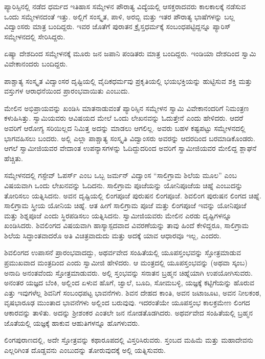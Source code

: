  ಪ್ಯಾರಿಸ್ಸಿನಲ್ಲಿ ನಡೆದ ಧರ್ಮದ ಇತಿಹಾಸ ಸಮ್ಮೇಳನ ಪೌರಾತ್ಯ ವಿದ್ಯೆಯಲ್ಲಿ ಆಸಕ್ತರಾದವರು ಕಾಲಕಾಲಕ್ಕೆ ನಡೆಸುವ ಒಂದು ಸಮ್ಮೇಳನದಂತೆ ಇತ್ತು. ಅಲ್ಲಿಗೆ ಸಂಸ್ಕೃತ, ಪಾಳಿ, ಅರಬ್ಬಿ ಮತ್ತು ಇತರ ಪೌರಾತ್ಯ ಭಾಷೆಗಳನ್ನು ಬಲ್ಲ ವಿದ್ವಾಂಸರು ಮಾತ್ರ ಬಂದಿದ್ದರು. ಇವರ ಜೊತೆಗೆ ಪುರಾತನ ಕ್ರೈಸ್ತಧರ್ಮಕ್ಕೆ ಸಂಬಂಧಪಟ್ಟಿದ್ದನ್ನೂ ಪ್ಯಾರಿಸ್ ಸಮ್ಮೇಳನದಲ್ಲಿ ಸೇರಿಸಿದ್ದರು. 

 ಏಷ್ಯಾ ದೇಶದಿಂದ ಸಮ್ಮೇಳನಕ್ಕೆ ಮೂರು ಜನ ಜಪಾನಿ ಪಂಡಿತರು ಮಾತ್ರ ಬಂದಿದ್ದರು. ಇಂಡಿಯಾ ದೇಶದಿಂದ ಸ್ವಾಮಿ ವಿವೇಕಾನಂದರು ಬಂದಿದ್ದರು. 

 ಪಾಶ್ಚಾತ್ಯ ಸಂಸ್ಕೃತ ವಿದ್ವಾಂಸರ ದೃಷ್ಟಿಯಲ್ಲಿ ವೈದಿಕಧರ್ಮವು ಪ್ರಕೃತಿಯಲ್ಲಿ ಭಯಭಕ್ತಿಯನ್ನು ಹುಟ್ಟಿಸುವ ಶಕ್ತಿ ಮತ್ತು ವಸ್ತುಗಳ ಆರಾಧನೆಯಿಂದ ಪ್ರಾರಂಭವಾಯಿತು ಎಂಬುದು. 

 ಮೇಲಿನ ಅಭಿಪ್ರಾಯವನ್ನು ಖಂಡಿಸಿ ಮಾತನಾಡುವಂತೆ ಪ್ಯಾರಿಸ್ಸಿನ ಸಮ್ಮೇಳನ ಸ್ವಾಮಿ ವಿವೇಕಾನಂದರಿಗೆ ನಿಮಂತ್ರಣ ಕಳುಹಿಸಿತ್ತು. ಸ್ವಾಮಿಯವರು ಆ‌ವಿಷಯದ ಮೇಲೆ ಒಂದು ಲೇಖನವನ್ನು ಓದುತ್ತೇನೆ ಎಂದು ಹೇಳಿದರು. ಆದರೆ ಅವರಿಗೆ ಆರೋಗ್ಯ ಸರಿಯಿಲ್ಲದ ನಿಮಿತ್ತ ಅದನ್ನು ಮಾಡಲು ಆಗಲಿಲ್ಲ. ಅವರು ಬಹಳ ಕಷ್ಟಪಟ್ಟು ಸಮ್ಮೇಳನದಲ್ಲಿ ಭಾಗವಹಿಸಲು ಬಂದರು. ಅಲ್ಲಿ ಎಲ್ಲಾ ಪಾಶ್ಚಾತ್ಯ ಸಂಸ್ಕೃತಿ ವಿದ್ವಾಂಸರು ಅವರನ್ನು ಆದರದಿಂದ ಬರಮಾಡಿಕೊಂಡರು. ಆಗಲೆ ಸ್ವಾಮೀಜಿಯವರ ವೇದಾಂತ ಉಪನ್ಯಾಸಗಳನ್ನು ಓದಿದ್ದುದರಿಂದ ಅವರಿಗೆ ಸ್ವಾಮೀಜಿಯವರ ಮೇಲಿದ್ದ ಶ್ಲಾಘನೆ ಹೆಚ್ಚಿತು. 

 ಸಮ್ಮೇಳನದಲ್ಲಿ ಗಸ್ಟೇವ್ ಓಪರ್ಸ್ ಎಂಬ ಒಬ್ಬ ಜರ್ಮನ್ ವಿದ್ವಾಂಸ “ಸಾಲಿಗ್ರಾಮ ಶಿಲೆಯ ಮೂಲ” ಎಂಬ ವಿಷಯವಾಗಿ ಒಂದು ಲೇಖನವನ್ನು ಓದಿದನು. ಸಾಲಿಗ್ರಾಮ ಪೂಜೆಯನ್ನು ಯೋನಿಪೂಜೆಯ ಚಿಹ್ನೆ ಎಂಬುದನ್ನು ತೋರಿಸಲು ಯತ್ನಿಸಿದನು. ಅವನ ದೃಷ್ಟಿಯಲ್ಲಿ ಲಿಂಗಪೂಜೆ ಪುರುಷನ ಲಿಂಗಪೂಜೆ. ಶಿವಲಿಂಗ ಪುರುಷನ ಲಿಂಗದ ಚಿಹ್ನೆ. ಸಾಲಿಗ್ರಾಮ ಸ್ತ್ರೀಯ ಯೋನಿಯ ಚಿಹ್ನೆ. ಆತ ಹೀಗೆ ಸಾಲಿಗ್ರಾಮ ಪೂಜೆ ಮತ್ತು ಲಿಂಗಪೂಜೆ ಇವನ್ನು ಯೋನಿಪೂಜೆ ಮತ್ತು ಶಿಶ್ನಪೂಜೆ ಎಂದು ಸ್ಥಿರಪಡಿಸಲು ಯತ್ನಿಸಿದನು. ಸ್ವಾಮೀಜಿಯವರು ಮೇಲಿನ ಎರಡು ದೃಷ್ಟಿಗಳನ್ನೂ ಖಂಡಿಸಿದರು. ಶಿವಲಿಂಗದ ವಿಷಯವಾಗಿ ಹಾಸ್ಯಾಸ್ಪದವಾದ ವಿವರಣೆಯನ್ನು ತಾವು ಹಿಂದೆ ಕೇಳಿದ್ದರೂ, ಸಾಲಿಗ್ರಾಮ ಶಿಲೆಯ ಸಿದ್ಧಾಂತವಾದರೊ ಅತಿ ವಿಚಿತ್ರವಾದುದು ಮತ್ತು ಅದಕ್ಕೆ ಯಾವ ಆಧಾರವೂ ಇಲ್ಲ, ಎಂದರು. 

 ಶಿವಲಿಂಗದ ಉಪಾಸನೆ ಪ್ರಾರಂಭವಾದದ್ದು, ಅಥರ್ವವೇದ ಸಂಹಿತೆಯಲ್ಲಿ ಯೂಪಸ್ತಂಭವನ್ನು ಸ್ತೋತ್ರಮಾಡುವ ಪ್ರಮುಖವಾದ ಮಂತ್ರದಿಂದ ಎಂದು ಸ್ವಾಮೀಜಿ ಹೇಳಿದರು. ಆ ಮಂತ್ರದಲ್ಲಿ ಯೂಪಸ್ತಂಭವನ್ನು (ಅಥವಾ ಸ್ಕಂಬ) ಅನಾದಿ ಅನಂತವೆಂದು ಸ್ತೋತ್ರಮಾಡುವರು. ಅಲ್ಲಿ ಸ್ತಂಭವನ್ನು ಸನಾತನ ಬ್ರಹ್ಮನ ಚಿಹ್ನೆಯಾಗಿ ಉಪಯೋಗಿಸುವರು. ಅನಂತರ ಯಜ್ಞದ ಬೆಂಕಿ, ಅಲ್ಲಿಂದ ಏಳುವ ಹೊಗೆ, ಜ್ವಾಲೆ, ಬೂದಿ, ಸೋಮಬಳ್ಳಿ, ಯಜ್ಞಕ್ಕೆ ಕಟ್ಟಿಗೆಯನ್ನು ಹೊರುವ ಎತ್ತು ಇವುಗಳೆಲ್ಲ ಶಿವನಿಗೆ ಸಂಬಂಧಪಟ್ಟ ಭಾವನೆಗಳು. ಶಿವನ ದೇಹದ ಕಾಂತಿ, ಅವನ ಜಟಾಜೂಟ, ಅವನ ನೀಲಕಂಠ, ವೃಷಭಾರೂಢ ಮುಂತಾದ ಭಾವನೆಗಳು ಅಲ್ಲಿಂದ ಬರುವುವು. ಇದರಂತೆಯೇ ಯೂಪಸ್ತಂಭ ಕಾಲಕ್ರಮೇಣ ಲಿಂಗದ ಆಕಾರವನ್ನು ತಾಳಿತು. ಅದನ್ನು ಶ‍್ರೀಶಂಕರ ಎಂತಲೇ ಜನ ನೋಡತೊಡಗಿದರು. ಅಥರ್ವವೇದ ಸಂಹಿತೆಯಲ್ಲಿ ಬ್ರಹ್ಮನ ಜೊತೆಯಲ್ಲಿ ಯಜ್ಞಕ್ಕೆ ಹಾಕುವ ಆಹುತಿಗಳನ್ನೂ ಹೊಗಳುವರು. 

 ಲಿಂಗಪುರಾಣದಲ್ಲಿ, ಅದೇ ಸ್ತೋತ್ರವನ್ನು ಕಥಾರೂಪದಲ್ಲಿ ವಿಸ್ತರಿಸಿರುವರು. ಸ್ತಂಬದ ಮಹಿಮೆ ಮತ್ತು ಮಹಾದೇವನು ಎಲ್ಲರಿಗಿಂತ ದೊಡ್ಡವನು ಎಂಬುದನ್ನು ತೋರುವುದಕ್ಕೆ ಅಲ್ಲಿ ಯತ್ನಿಸುವರು. 

